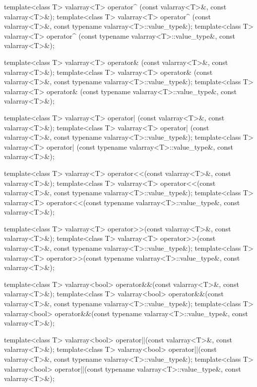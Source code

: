 \begin{codeblock}
{  template<class T> valarray<T> operator^ (const valarray<T>&, const valarray<T>&);
  template<class T> valarray<T> operator^ (const valarray<T>&,
                                           const typename valarray<T>::value_type&);
  template<class T> valarray<T> operator^ (const typename valarray<T>::value_type&,
                                           const valarray<T>&);

  template<class T> valarray<T> operator& (const valarray<T>&, const valarray<T>&);
  template<class T> valarray<T> operator& (const valarray<T>&,
                                           const typename valarray<T>::value_type&);
  template<class T> valarray<T> operator& (const typename valarray<T>::value_type&,
                                           const valarray<T>&);

  template<class T> valarray<T> operator| (const valarray<T>&, const valarray<T>&);
  template<class T> valarray<T> operator| (const valarray<T>&,
                                           const typename valarray<T>::value_type&);
  template<class T> valarray<T> operator| (const typename valarray<T>::value_type&,
                                           const valarray<T>&);

  template<class T> valarray<T> operator<<(const valarray<T>&, const valarray<T>&);
  template<class T> valarray<T> operator<<(const valarray<T>&,
                                           const typename valarray<T>::value_type&);
  template<class T> valarray<T> operator<<(const typename valarray<T>::value_type&,
                                           const valarray<T>&);

  template<class T> valarray<T> operator>>(const valarray<T>&, const valarray<T>&);
  template<class T> valarray<T> operator>>(const valarray<T>&,
                                           const typename valarray<T>::value_type&);
  template<class T> valarray<T> operator>>(const typename valarray<T>::value_type&,
                                           const valarray<T>&);

  template<class T> valarray<bool> operator&&(const valarray<T>&, const valarray<T>&);
  template<class T> valarray<bool> operator&&(const valarray<T>&,
                                              const typename valarray<T>::value_type&);
  template<class T> valarray<bool> operator&&(const typename valarray<T>::value_type&,
                                              const valarray<T>&);

  template<class T> valarray<bool> operator||(const valarray<T>&, const valarray<T>&);
  template<class T> valarray<bool> operator||(const valarray<T>&,
                                              const typename valarray<T>::value_type&);
  template<class T> valarray<bool> operator||(const typename valarray<T>::value_type&,
                                              const valarray<T>&);

}
\end{codeblock}
